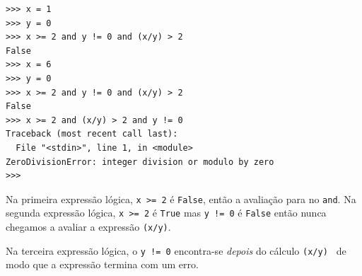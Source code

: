 \beforeverb
\begin{verbatim}
>>> x = 1
>>> y = 0
>>> x >= 2 and y != 0 and (x/y) > 2
False
>>> x = 6 
>>> y = 0
>>> x >= 2 and y != 0 and (x/y) > 2
False
>>> x >= 2 and (x/y) > 2 and y != 0
Traceback (most recent call last):
  File "<stdin>", line 1, in <module>
ZeroDivisionError: integer division or modulo by zero
>>>
\end{verbatim}
\afterverb
%

Na primeira expressão lógica, {\tt x >= 2} é {\tt False}, então a avaliação
para no {\tt and}. Na segunda expressão lógica, {\tt x >= 2} é {\tt True}
mas {\tt y != 0} é {\tt False} então nunca chegamos a avaliar a expressão {\tt (x/y)}.



Na terceira expressão lógica, o {\tt y != 0} encontra-se \emph{depois} do cálculo
{\tt (x/y) } de modo que a expressão termina com um erro.




